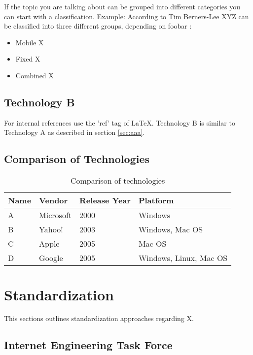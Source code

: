 If the topic you are talking about can be grouped into different categories you can start with a classification.
Example: According to Tim Berners-Lee XYZ can be classified into three different groups, depending on foobar \cite{timwww}:
	\begin{itemize}
		\item Mobile X
				\vspace{-0.1in} 
		\item Fixed X
				\vspace{-0.1in} 
		\item Combined X
 	\end{itemize}

\subsection{Technology B\label{sec:bbb}}

For internal references use the 'ref' tag of LaTeX. Technology B is similar to Technology A as described in section \ref{sec:aaa}.

\newpage

\subsection{Comparison of Technologies\label{sec:comp}}

\begin{table}[htb]
\centering
\begin{tabular}[t]{|l|l|l|l|}
\hline
Name & Vendor & Release Year & Platform \\
\hline
\hline
A & Microsoft & 2000 & Windows \\
\hline
B & Yahoo! & 2003 & Windows, Mac OS \\
\hline
C & Apple & 2005 & Mac OS \\
\hline
D & Google & 2005 & Windows, Linux, Mac OS \\
\hline
\end{tabular}
\caption{Comparison of technologies}
\label{tab:enghistory}
\end{table}

\section{Standardization \label{sec:standard}}

This sections outlines standardization approaches regarding X.

\subsection{Internet Engineering Task Force\label{sec:itu}}

